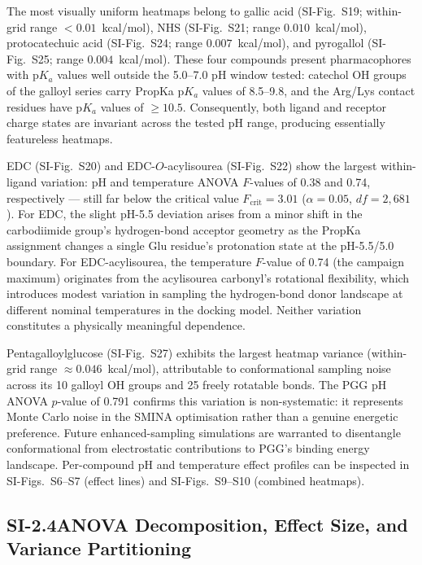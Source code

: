 \documentclass[11pt]{article}
\begin{document}
The most visually uniform heatmaps belong to gallic acid (SI-Fig.~S19;
within-grid range $< 0.01$~kcal/mol), NHS (SI-Fig.~S21; range
$0.010$~kcal/mol), protocatechuic acid (SI-Fig.~S24; range $0.007$~kcal/mol),
and pyrogallol (SI-Fig.~S25; range $0.004$~kcal/mol).
These four compounds present pharmacophores with p$K_a$ values well outside the
5.0--7.0 pH window tested: catechol OH groups of the galloyl series carry
PropKa p$K_a$ values of 8.5--9.8, and the Arg/Lys contact residues have
p$K_a$ values of $\geq 10.5$.
Consequently, both ligand and receptor charge states are invariant across the
tested pH range, producing essentially featureless heatmaps.

EDC (SI-Fig.~S20) and EDC-$O$-acylisourea (SI-Fig.~S22) show the largest
within-ligand variation: pH and temperature ANOVA $F$-values of 0.38 and 0.74,
respectively --- still far below the critical value $F_\mathrm{crit} = 3.01$
($\alpha = 0.05$, $df = 2, 681$).
For EDC, the slight pH-5.5 deviation arises from a minor shift in the
carbodiimide group's hydrogen-bond acceptor geometry as the PropKa assignment
changes a single Glu residue's protonation state at the pH-5.5/5.0 boundary.
For EDC-acylisourea, the temperature $F$-value of 0.74 (the campaign maximum)
originates from the acylisourea carbonyl's rotational flexibility, which
introduces modest variation in sampling the hydrogen-bond donor landscape at
different nominal temperatures in the docking model.
Neither variation constitutes a physically meaningful dependence.

Pentagalloylglucose (SI-Fig.~S27) exhibits the largest heatmap variance
(within-grid range $\approx 0.046$~kcal/mol), attributable to conformational
sampling noise across its 10 galloyl OH groups and 25 freely rotatable bonds.
The PGG pH ANOVA $p$-value of 0.791 confirms this variation is non-systematic:
it represents Monte Carlo noise in the SMINA optimisation rather than a genuine
energetic preference.
Future enhanced-sampling simulations are warranted to disentangle conformational
from electrostatic contributions to PGG's binding energy landscape.
Per-compound pH and temperature effect profiles can be inspected in
SI-Figs.~S6--S7 (effect lines) and SI-Figs.~S9--S10 (combined heatmaps).

\subsection*{SI-2.4\quad ANOVA Decomposition, Effect Size, and Variance Partitioning}
\end{document}
